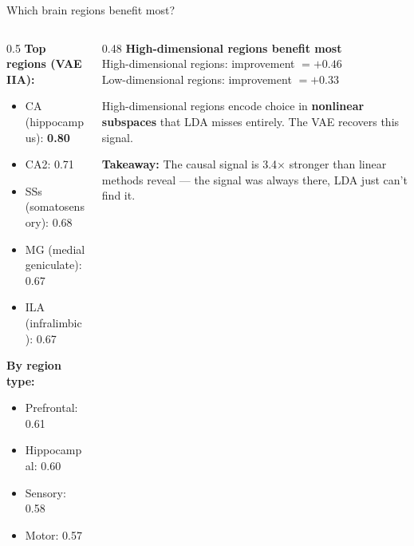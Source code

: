 \documentclass[aspectratio=169,11pt]{beamer}
\begin{document}
\begin{frame}{Which brain regions benefit most?}
\begin{columns}[T]
\begin{column}{0.5\textwidth}
\textbf{Top regions (VAE IIA):}
\begin{itemize}\setlength\itemsep{0pt}
  \item CA (hippocampus): \textbf{0.80}
  \item CA2: 0.71
  \item SSs (somatosensory): 0.68
  \item MG (medial geniculate): 0.67
  \item ILA (infralimbic): 0.67
\end{itemize}

\vspace{0.3em}
\textbf{By region type:}
\begin{itemize}\setlength\itemsep{0pt}
  \item Prefrontal: 0.61
  \item Hippocampal: 0.60
  \item Sensory: 0.58
  \item Motor: 0.57
\end{itemize}
\end{column}
\begin{column}{0.48\textwidth}
\textbf{High-dimensional regions benefit most}\\[0.3em]
{\small High-dimensional regions: improvement $= +0.46$\\
Low-dimensional regions: improvement $= +0.33$}

\vspace{0.5em}
{\small High-dimensional regions encode choice in \textbf{nonlinear subspaces} that LDA misses entirely. The VAE recovers this signal.}

\vspace{0.5em}
{\small \textbf{Takeaway:} The causal signal is 3.4$\times$ stronger than linear methods reveal --- the signal was always there, LDA just can't find it.}
\end{column}
\end{columns}
\end{frame}


\begin{frame}[plain]
\vfill
\begin{center}
  \setlength{\fboxrule}{2.5pt}%
\end{center}
\vfill
\end{frame}
\end{document}
